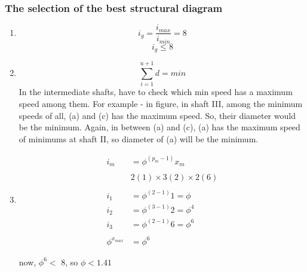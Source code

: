 \documentclass{article}
\begin{document}
\begin{multicols*}{2}
  \subsubsection*{The selection of the best structural diagram}
  \begin{enumerate}
    \item $$i_g = \frac{i_{max}}{i_{min}} = 8$$
    $$i_g \leq 8$$
    \item $$\sum_{i = 1}^{u+1} d = min $$
    In the intermediate shafts, have to check which min speed has a maximum speed among them. For example - in figure, in shaft III, among the minimum speeds of all, (a) and (c) has the maximum speed. So, their diameter would be the minimum. Again, in between (a) and (c), (a) has the maximum speed of minimums at shaft II, so diameter of (a) will be the minimum.
    \item 
    \begin{align*}
      i_m &= \phi^{(p_m - 1)}x_m \\ 
      &\\
      & 2(1)\times 3(2)\times 2(6) \\ 
      &\\
      i_1 &= \phi^{(2 - 1)}1 = \phi \\ 
      i_2 &= \phi^{(3 - 1)}2 = \phi^4\\ 
      i_3 &= \phi^{(2 - 1)}6 = \phi^6\\ 
      &\\
      \phi^{x_{max}} &= \phi^6
    \end{align*}

    now, $\phi^6 < $  8, so $\phi < 1.41$ 
  \end{enumerate}

\end{multicols*}
\end{document}
